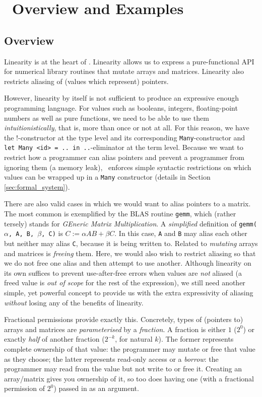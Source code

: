 \section{\lang\ Overview and Examples}\label{sec:lang_and_examples}

\subsection{Overview}

Linearity is at the heart of \lang. Linearity allows us to express a
pure-functional API for numerical library routines that mutate arrays and
matrices. Linearity also restricts aliasing of (values which represent)
pointers.

However, linearity by itself is not sufficient to produce an expressive enough
programming language. For values such as booleans, integers, floating-point
numbers as well as pure functions, we need to be able to use them
\emph{intuitionistically}, that is, more than once or not at all. For this
reason, we have the !-constructor at the type level and its corresponding
\texttt{Many}-constructor and \texttt{let Many <id> = .. in ..}-eliminator at
the term level. Because we want to restrict how a programmer can alias pointers
and prevent a programmer from ignoring them (a memory leak), \lang\ enforces
simple syntactic restrictions on which values can be wrapped up in a
\texttt{Many} constructor (details in Section \ref{sec:formal_system}).

There are also valid cases in which we would want to alias pointers to a
matrix. The most common is exemplified by the BLAS routine \texttt{gemm}, which
(rather tersely) stands for \emph{GEneric Matrix Multiplication}.  A
\emph{simplified} definition of \texttt{gemm($\alpha$, A, B, $\beta$, C)} is $C
:= \alpha AB + \beta C$. In this case, \texttt{A} and \texttt{B} may alias each
other but neither may alias \texttt{C}, because it is being written to.
Related to \emph{mutating} arrays and matrices is \emph{freeing} them. Here, we
would also wish to restrict aliasing so that we do not free one alias and then
attempt to use another. Although linearity on its own suffices to prevent
use-after-free errors when values are \emph{not} aliased (a freed value is
\emph{out of scope} for the rest of the expression), we still need another
simple, yet powerful concept to provide us with the extra expressivity of
aliasing \emph{without} losing any of the benefits of linearity.

Fractional permissions provide exactly this. Concretely, types of (pointers to)
arrays and matrices are \emph{parameterised} by a \emph{fraction}. A fraction
is either $1$ ($2^0$) or exactly \emph{half} of another fraction ($2^{-k}$, for
natural $k$). The former represents complete ownership of that value: the
programmer may mutate or free that value as they choose; the latter represents
read-only access or a \emph{borrow}: the programmer may read from the value but
not write to or free it. Creating an array/matrix gives you ownership of it, so
too does having one (with a fractional permission of $2^0$) passed in as an
argument.

